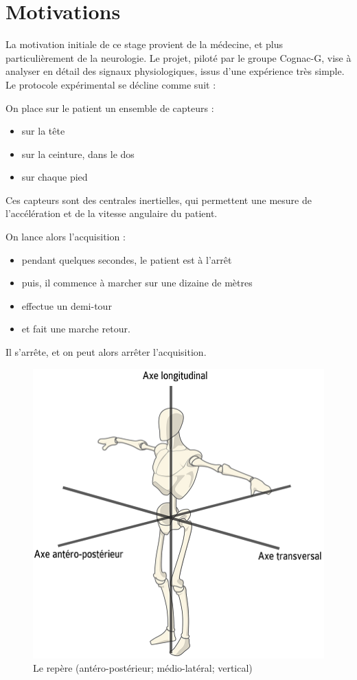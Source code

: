\documentclass[french,11pt,notitlepage]{report}
\begin{document}
	
	
	\section{Motivations}
	
	
		La motivation initiale de ce stage provient de la médecine,
		et plus particulièrement de la neurologie.
		Le projet, piloté par le groupe Cognac-G,
		vise à analyser en détail des signaux physiologiques,
		issus d'une expérience très simple.
		Le protocole expérimental se décline comme suit :
		
		On place sur le patient un ensemble de capteurs :
	\begin{itemize}
		\item sur la tête
		\item sur la ceinture, dans le dos
		\item sur chaque pied
	\end{itemize}	
	
		Ces capteurs sont des centrales inertielles, qui permettent une mesure de l'accélération et de la vitesse angulaire du patient.

		On lance alors l'acquisition :
	\begin{itemize}
		\item pendant quelques secondes, le patient est à l'arrêt
		\item puis, il commence à marcher sur une dizaine de mètres
		\item effectue un demi-tour
		\item et fait une marche retour.
	\end{itemize}
		
	Il s'arrête, et on peut alors arrêter l'acquisition.

	\begin{figure}[!h]
		\hspace{5.6cm}\includegraphics[scale=0.3]{axis.png}
		\caption{Le repère (antéro-postérieur; médio-latéral; vertical)}
		\label{axis}
	\end{figure}
	
\end{document}
